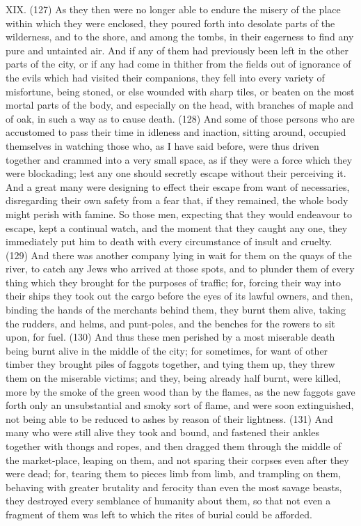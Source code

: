 XIX. (127) As they then were no longer able to endure the misery of the place within which they
were enclosed, they poured forth into desolate parts of the wilderness, and to the shore, and
among the tombs, in their eagerness to find any pure and untainted air. And if any of them had
previously been left in the other parts of the city, or if any had come in thither from the fields out of
ignorance of the evils which had visited their companions, they fell into every variety of misfortune,
being stoned, or else wounded with sharp tiles, or beaten on the most mortal parts of the body, and
especially on the head, with branches of maple and of oak, in such a way as to cause death. (128)
And some of those persons who are accustomed to pass their time in idleness and inaction, sitting
around, occupied themselves in watching those who, as I have said before, were thus driven
together and crammed into a very small space, as if they were a force which they were blockading;
lest any one should secretly escape without their perceiving it. And a great many were designing to
effect their escape from want of necessaries, disregarding their own safety from a fear that, if they
remained, the whole body might perish with famine. So those men, expecting that they would
endeavour to escape, kept a continual watch, and the moment that they caught any one, they
immediately put him to death with every circumstance of insult and cruelty. (129) And there was
another company lying in wait for them on the quays of the river, to catch any Jews who arrived at
those spots, and to plunder them of every thing which they brought for the purposes of traffic; for,
forcing their way into their ships they took out the cargo before the eyes of its lawful owners, and
then, binding the hands of the merchants behind them, they burnt them alive, taking the rudders,
and helms, and punt-poles, and the benches for the rowers to sit upon, for fuel. (130) And thus
these men perished by a most miserable death being burnt alive in the middle of the city; for
sometimes, for want of other timber they brought piles of faggots together, and tying them up, they
threw them on the miserable victims; and they, being already half burnt, were killed, more by the
smoke of the green wood than by the flames, as the new faggots gave forth only an unsubstantial
and smoky sort of flame, and were soon extinguished, not being able to be reduced to ashes by
reason of their lightness. (131) And many who were still alive they took and bound, and fastened
their ankles together with thongs and ropes, and then dragged them through the middle of the
market-place, leaping on them, and not sparing their corpses even after they were dead; for,
tearing them to pieces limb from limb, and trampling on them, behaving with greater brutality and
ferocity than even the most savage beasts, they destroyed every semblance of humanity about
them, so that not even a fragment of them was left to which the rites of burial could be afforded.

